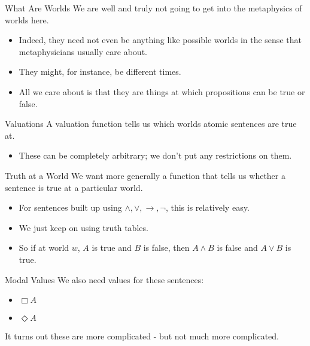 \documentclass[
  14pt,
  letterpaper,
  ignorenonframetext,
  aspectratio=169,
  handout]{beamer}
\providecommand{\tightlist}{%
  \setlength{\itemsep}{0pt}\setlength{\parskip}{0pt}}\usepackage{longtable,booktabs,array}
\begin{document}
\begin{frame}{What Are Worlds}
\protect\hypertarget{what-are-worlds}{}
We are well and truly not going to get into the metaphysics of worlds
here.

\begin{itemize}[<+->]
\tightlist
\item
  Indeed, they need not even be anything like possible worlds in the
  sense that metaphysicians usually care about.
\item
  They might, for instance, be different times.
\item
  All we care about is that they are things at which propositions can be
  true or false.
\end{itemize}
\end{frame}

\begin{frame}{Valuations}
\protect\hypertarget{valuations}{}
A valuation function tells us which worlds atomic sentences are true at.

\begin{itemize}[<+->]
\tightlist
\item
  These can be completely arbitrary; we don't put any restrictions on
  them.
\end{itemize}
\end{frame}

\begin{frame}{Truth at a World}
\protect\hypertarget{truth-at-a-world}{}
We want more generally a function that tells us whether a sentence is
true at a particular world.

\begin{itemize}[<+->]
\tightlist
\item
  For sentences built up using \(\wedge, \vee, \rightarrow, \neg\), this
  is relatively easy.
\item
  We just keep on using truth tables.
\item
  So if at world \(w\), \(A\) is true and \(B\) is false, then
  \(A \wedge B\) is false and \(A \vee B\) is true.
\end{itemize}
\end{frame}

\begin{frame}{Modal Values}
\protect\hypertarget{modal-values}{}
We also need values for these sentences:

\begin{itemize}[<+->]
\tightlist
\item
  \(\Box A\)
\item
  \(\Diamond A\)
\end{itemize}

It turns out these are more complicated - but not much more complicated.
\end{frame}
\end{document}
